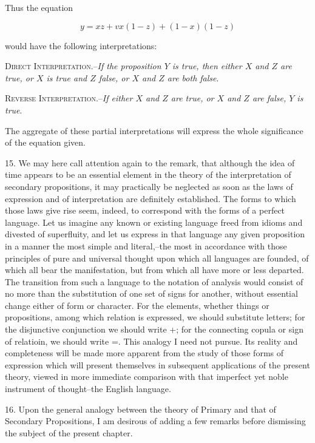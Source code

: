\documentclass[oneside]{book}
\begin{document}
Thus the equation

\[
y = xz + vx (1 - z) + (1 - x) (1 - z)
\]

would have the following interpretations:

\textsc{Direct Interpretation}.--\textit{If the proposition $Y$ is true, then
either $X$ and $Z$ are true, or $X$ is true and $Z$ false, or $X$ and $Z$
are both false}.

\textsc{Reverse Interpretation}.--\textit{If either $X$ and $Z$ are true, or
$X$ and $Z$ are false, $Y$ is true}.

The aggregate of these partial interpretations will express
the whole significance of the equation given.

15. We may here call attention again to the remark, that
although the idea of time appears to be an essential element in
the theory of the interpretation of secondary propositions, it may
practically be neglected as soon as the laws of expression and of
interpretation are definitely established. The forms to which
those laws give rise seem, indeed, to correspond with the forms of
a perfect language. Let us imagine any known or existing language
freed from idioms and divested of superfluity, and let us
express in that language any given proposition in a manner the
most simple and literal,--the most in accordance with those
principles of pure and universal thought upon which all languages
are founded, of which all bear the manifestation, but from which
all have more or less departed. The transition from such a language
to the notation of analysis would consist of no more than
the substitution of one set of signs for another, without essential
change either of form or character. For the elements, whether
things or propositions, among which relation is expressed, we
should substitute letters; for the disjunctive conjunction we
should write +; for the connecting copula or sign of relatioin, we
should write =. This analogy I need not pursue. Its reality
and completeness will be made more apparent from the study of
those forms of expression which will present themselves in subsequent applications of the present theory, viewed in more immediate
comparison with that imperfect yet noble instrument of
thought--the English language.

16. Upon the general analogy between the theory of Primary
and that of Secondary Propositions, I am desirous of adding a
few remarks before dismissing the subject of the present chapter.
\end{document}
